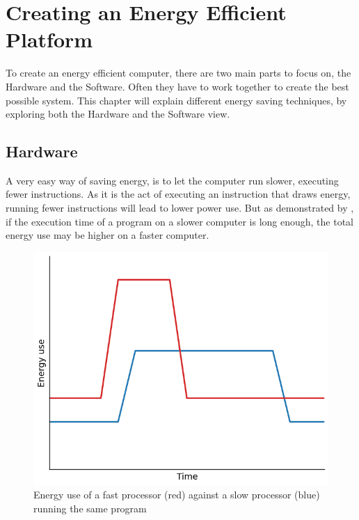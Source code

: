 \chapter{Creating an Energy Efficient Platform}
\label{chap:chapter2}

To create an energy efficient computer, there are two main parts to focus on, the Hardware and the Software.
Often they have to work together to create the best possible system.
This chapter will explain different energy saving techniques, by exploring both the Hardware and the Software view.

\section{Hardware}
\label{sec:hwenergy}
A very easy way of saving energy, is to let the computer run slower, executing fewer instructions.
As it is the act of executing an instruction that draws energy, running fewer instructions will lead to lower power use.
But as demonstrated by , if the execution time of a program on a slower computer is long enough, the total energy use may be higher on a faster computer.

\begin{figure}[h]
\centering
\includegraphics[scale=0.5]{fig/graphs/energyusetime.png}
\caption{Energy use of a fast processor (red) against a slow processor (blue) running the same program}
\label{fig:energyusetime}
\end{figure}

